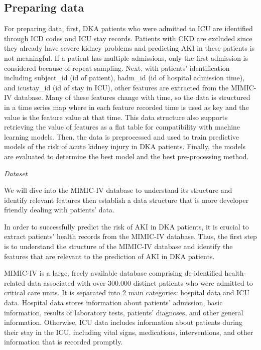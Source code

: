\documentclass[sn-mathphys-num]{sn-jnl}%
\theoremstyle{thmstyleone}%
\theoremstyle{thmstyletwo}%
\theoremstyle{thmstylethree}%
\begin{document}
\subsection{Preparing data}

For preparing data, first, DKA patients who were admitted to ICU are identified through ICD codes and ICU stay records.
Patients with CKD are excluded since they already have severe kidney problems and predicting AKI in these patients is not meaningful.
If a patient has multiple admissions, only the first admission is considered because of repeat sampling.
Next, with patients' identification including subject\_id (id of patient), hadm\_id (id of hospital admission time), and icustay\_id (id of stay in ICU), other features are extracted from the MIMIC-IV database.
Many of these features change with time, so the data is structured in a time series map where in each feature recorded time is used as key and the value is the feature value at that time.
This data structure also supports retrieving the value of features as a flat table for compatibility with machine learning models.
Then, the data is preprocessed and used to train predictive models of the risk of acute kidney injury in DKA patients.
Finally, the models are evaluated to determine the best model and the best pre-processing method.


\textit{Dataset}\label{subsec31}

We will dive into the MIMIC-IV database to understand its structure and identify relevant features then establish a data structure that is more developer friendly dealing with patients' data.

In order to successfully predict the risk of AKI in DKA patients, it is crucial to extract patients' health records from the MIMIC-IV database.
Thus, the first step is to understand the structure of the MIMIC-IV database and identify the features that are relevant to the prediction of AKI in DKA patients.

MIMIC-IV is a large, freely available database comprising de-identified health-related data associated with over 300.000 distinct patients who were admitted to critical care units.
It is separated into 2 main categories: hospital data and ICU data.
Hospital data stores information about patients' admission, basic information, results of laboratory tests, patients' diagnoses, and other general information. Otherwise, ICU data includes information about patients during their stay in the ICU, including vital signs, medications, interventions, and other information that is recorded promptly.
\end{document}
